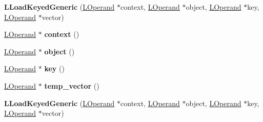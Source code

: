 \begin{DoxyCompactItemize}
\item 
{\bfseries L\+Load\+Keyed\+Generic} (\hyperlink{classv8_1_1internal_1_1_l_operand}{L\+Operand} $\ast$context, \hyperlink{classv8_1_1internal_1_1_l_operand}{L\+Operand} $\ast$object, \hyperlink{classv8_1_1internal_1_1_l_operand}{L\+Operand} $\ast$key, \hyperlink{classv8_1_1internal_1_1_l_operand}{L\+Operand} $\ast$vector)\hypertarget{classv8_1_1internal_1_1_l_load_keyed_generic_a00c3e8047fc556277f4ec4ebc4207cf8}{}\label{classv8_1_1internal_1_1_l_load_keyed_generic_a00c3e8047fc556277f4ec4ebc4207cf8}

\item 
\hyperlink{classv8_1_1internal_1_1_l_operand}{L\+Operand} $\ast$ {\bfseries context} ()\hypertarget{classv8_1_1internal_1_1_l_load_keyed_generic_a522e2bd4a7d1b71a95f891c1fc9a99c8}{}\label{classv8_1_1internal_1_1_l_load_keyed_generic_a522e2bd4a7d1b71a95f891c1fc9a99c8}

\item 
\hyperlink{classv8_1_1internal_1_1_l_operand}{L\+Operand} $\ast$ {\bfseries object} ()\hypertarget{classv8_1_1internal_1_1_l_load_keyed_generic_aadfba9d6286d59cc727bce5ae1b74ee7}{}\label{classv8_1_1internal_1_1_l_load_keyed_generic_aadfba9d6286d59cc727bce5ae1b74ee7}

\item 
\hyperlink{classv8_1_1internal_1_1_l_operand}{L\+Operand} $\ast$ {\bfseries key} ()\hypertarget{classv8_1_1internal_1_1_l_load_keyed_generic_ad55d2217ba38aa46911c0e797a610388}{}\label{classv8_1_1internal_1_1_l_load_keyed_generic_ad55d2217ba38aa46911c0e797a610388}

\item 
\hyperlink{classv8_1_1internal_1_1_l_operand}{L\+Operand} $\ast$ {\bfseries temp\+\_\+vector} ()\hypertarget{classv8_1_1internal_1_1_l_load_keyed_generic_ac529ed41ee727bf1e320ad6711ce2cff}{}\label{classv8_1_1internal_1_1_l_load_keyed_generic_ac529ed41ee727bf1e320ad6711ce2cff}

\item 
{\bfseries L\+Load\+Keyed\+Generic} (\hyperlink{classv8_1_1internal_1_1_l_operand}{L\+Operand} $\ast$context, \hyperlink{classv8_1_1internal_1_1_l_operand}{L\+Operand} $\ast$object, \hyperlink{classv8_1_1internal_1_1_l_operand}{L\+Operand} $\ast$key, \hyperlink{classv8_1_1internal_1_1_l_operand}{L\+Operand} $\ast$vector)\hypertarget{classv8_1_1internal_1_1_l_load_keyed_generic_a00c3e8047fc556277f4ec4ebc4207cf8}{}\label{classv8_1_1internal_1_1_l_load_keyed_generic_a00c3e8047fc556277f4ec4ebc4207cf8}


\end{DoxyCompactItemize}
